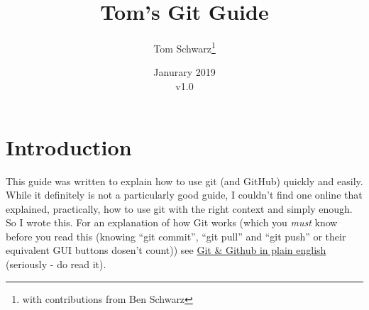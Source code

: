 \documentclass[11pt, titlepage]{article}
\title{Tom's Git Guide}
\author{Tom Schwarz\thanks{with contributions from Ben Schwarz}}
\date{Janurary 2019\\v1.0} %
\begin{document}
\maketitle

\tableofcontents

\section{Introduction}
This guide was written to explain how to use git (and GitHub) quickly and easily. While it definitely is not a particularly good guide, I couldn't find one online that explained, practically, how to use git with the right context and simply enough. So I wrote this. For an explanation of how Git works (which you \emph{must} know before you read this (knowing ``git commit'', ``git pull'' and ``git push'' or their equivalent GUI buttons dosen't count)) see \href{https://blog.red-badger.com/2016/11/29/gitgithub-in-plain-english}{Git \& Github in plain english} (seriously - do read it).

\pagebreak
\end{document}
